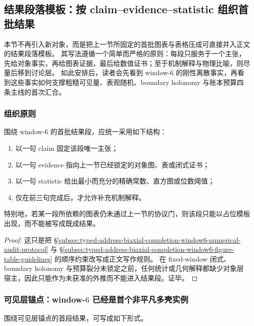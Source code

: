 \subsection{结果段落模板：按 claim--evidence--statistic 组织首批结果}\label{subsec:typed-address-biaxial-completion-window6-results-paragraph-templates}
本节不再引入新对象，而是把上一节所固定的首批图表与表格压成可直接并入正文的结果段落模板。
其写法遵循一个简单而严格的原则：每段只服务于一个主张，先给对象事实，再给图表证据，最后给数值证书；至于机制解释与物理比喻，则尽量后移到讨论层。
如此安排后，读者会先看到 window-\(6\) 的刚性离散事实，再看到这些事实如何支撑粗糙可见量、表观随机、boundary holonomy 与账本预算四条主线的首次汇合。

\subsubsection{组织原则}\label{subsubsec:typed-address-biaxial-completion-window6-results-organization-principle}
\begin{proposition}[首批结果段的组织原则]\label{prop:typed-address-biaxial-completion-window6-results-organization-principle}
围绕 window-\(6\) 的首批结果段，应统一采用如下结构：
\begin{enumerate}
  \item 以一句 claim 固定该段唯一主张；
  \item 以一句 evidence 指向上一节已经锁定的对象图、表或闭式证书；
  \item 以一句 statistic 给出最小而充分的精确常数、直方图或位数阈值；
  \item 仅在前三句完成后，才允许补充机制解释。
\end{enumerate}
特别地，若某一段所依赖的图表仍未通过上一节的协议门，则该段只能以占位模板出现，而不能被写成既成结果。
\end{proposition}

\begin{proof}
这只是把 \S\ref{subsec:typed-address-biaxial-completion-window6-numerical-audit-protocol} 与 \S\ref{subsec:typed-address-biaxial-completion-window6-figure-table-guidelines} 的顺序约束改写成正文写作规则。
在 fixed-window 闭式、boundary holonomy 与预算裂分未锁定之前，任何统计或几何解释都缺少对象层宿主，因此只能作为未获准的外推而不能进入结果段。证毕。
\end{proof}

\subsubsection{可见层锚点：window-\texorpdfstring{$6$}{6} 已经是首个非平凡多壳实例}\label{subsubsec:typed-address-biaxial-completion-window6-results-visible-anchor}
围绕可见层锚点的首段结果，可写成如下形式。

